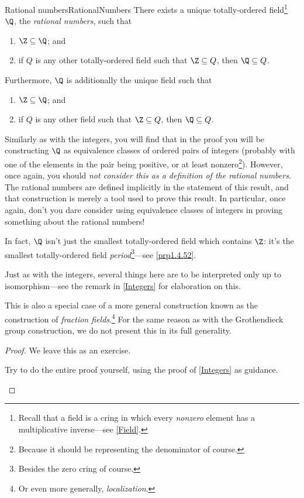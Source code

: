 \begin{thm}{Rational numbers}{RationalNumbers}
There exists a unique totally-ordered field\footnote{Recall that a field is a cring in which every \emph{nonzero} element has a multiplicative inverse---see \cref{Field}.} $\Q$, the \emph{rational numbers}, such that
\begin{enumerate}
\item \label{enm1.3.2.i}$\Z \subseteq \Q$; and
\item \label{enm1.3.2.ii}if $Q$ is any other totally-ordered field such that $\Z \subseteq Q$, then $\Q \subseteq Q$.
\end{enumerate}

Furthermore, $\Q$ is additionally the unique field such that
\begin{enumerate}
\item $\Z \subseteq \Q$; and
\item if $Q$ is any other field such that $\Z \subseteq Q$, then $\Q \subseteq Q$.
\end{enumerate}
\begin{rmk}
Similarly as with the integers, you will find that in the proof you will be constructing $\Q$ as equivalence classes of ordered pairs of integers (probably with one of the elements in the pair being positive, or at least nonzero\footnote{Because it should be representing the denominator of course.}).  However, once again, you should \emph{not consider this as a definition of the rational numbers}.  The rational numbers are defined implicitly in the statement of this result, and that construction is merely a tool used to prove this result.  In particular, once again, don't you dare consider using equivalence classes of integers in proving something about the rational numbers!
\end{rmk}
\begin{rmk}
In fact, $\Q$ isn't just the smallest totally-ordered field which contains $\Z$:  it's the smallest totally-ordered field \emph{period}\footnote{Besides the zero cring of course.}---see \cref{prp1.4.52}.
\end{rmk}
\begin{rmk}
Just as with the integers, several things here are to be interpreted only up to isomorphism---see the remark in \cref{Integers} for elaboration on this.
\end{rmk}
\begin{rmk}
This is also a special case of a more general construction known as the construction of \emph{fraction fields}.\footnote{Or even more generally, \emph{localization}.}  For the same reason as with the Grothendieck group construction, we do not present this in its full generality.
\end{rmk}
\begin{proof}
We leave this as an exercise.
\begin{exr}[breakable=false]{}{}
Try to do the entire proof yourself, using the proof of \cref{Integers} as guidance.
\end{exr}
\end{proof}
\end{thm}

